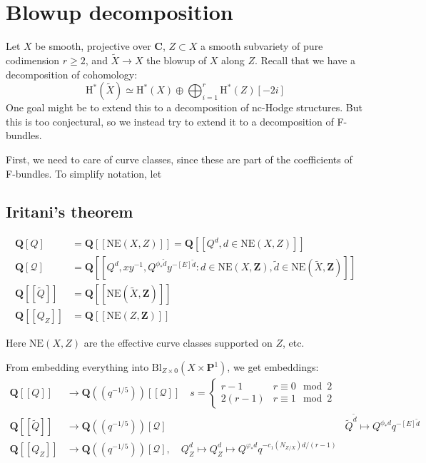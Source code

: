 \documentclass[11pt, reqno]{amsart}
\numberwithin{equation}{section}
\theoremstyle{plain}
\theoremstyle{definition}
\theoremstyle{italicsname}
\newcommand{\cQ}{\mathcal{Q}}
\newcommand{\rH}{\mathrm{H}}
\newcommand{\bC}{\mathbf{C}}
\newcommand{\bZ}{\mathbf{Z}}
\newcommand{\bP}{\mathbf{P}}
\newcommand{\bQ}{\mathbf{Q}}
\begin{document}


\section{Blowup decomposition} %
\label{sec:blowup_decomposition}

Let $X$ be smooth, projective over $\bC$, $Z \subset X$ a smooth subvariety of pure codimension $r \geq 2$, and $\tilde X \to X$ the blowup of $X$ along $Z$. Recall that we have a decomposition of cohomology:
\[
    \rH^*(\tilde X) \simeq \rH^*(X) \oplus \bigoplus_{i = 1}^r \rH^{*}(Z)[-2i]
\]
One goal might be to extend this to a decomposition of nc-Hodge structures. But this is too conjectural, so we instead try to extend it to a decomposition of F-bundles. 

First, we need to care of curve classes, since these are part of the coefficients of F-bundles. To simplify notation, let

\subsection*{Iritani's theorem}

\begin{align*}
    \bQ[Q] &= \bQ[[\mathrm{NE}(X, Z)]] = \bQ[[Q^d, d \in \mathrm{NE}(X, Z)]] \\
    \bQ[\cQ] &= \bQ[[Q^d, xy^{-1}, Q^{\phi_* \tilde d}y^{-[E]\tilde d}:d \in \mathrm{NE}(X, \bZ), \tilde d \in \mathrm{NE}(\tilde X, \bZ)]] \\
    \bQ[[\tilde Q]] &= \bQ[[\mathrm{NE}(\tilde X, \bZ)]] \\
    \bQ[[Q_Z]] &= \bQ[[\mathrm{NE}(Z, \bZ)]]
\end{align*}

Here $\mathrm{NE}(X, Z)$ are the effective curve classes supported on $Z$, etc.

From embedding everything into $\mathrm{Bl}_{Z \times 0}(X \times \bP^1)$, we get embeddings:
\begin{align*}
    \bQ[[Q]] &\to \bQ((q^{-1/5}))[[\cQ]] \quad s = \begin{cases}
        r - 1 & r \equiv 0 \mod 2\\
        2(r - 1) & r \equiv 1 \mod 2
    \end{cases} \\
    \bQ[[\tilde Q]] &\to \bQ((q^{-1/5}))[\cQ] & \tilde Q^{\tilde d} \mapsto Q^{\phi_* d} q^{-[E] \tilde d} \\
    \bQ[[Q_Z]] &\to \bQ((q^{-1/5}))[\cQ], \quad Q^d_Z \mapsto Q^d_Z \mapsto Q^{\varphi_*d} q^{-c_1(N_{Z/X})d/(r - 1)}
\end{align*}
\end{document}
